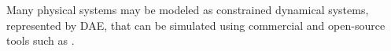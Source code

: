 
Many physical systems may be modeled as constrained dynamical systems, represented by DAE, that can be simulated using  
commercial and open-source tools such as \cite{2017OpenModelica, 2017WolframAnalysis, 2017SimscapeSimulink, 2017MapleSimSoftware, 2017DymolaSimulation}. 
%
